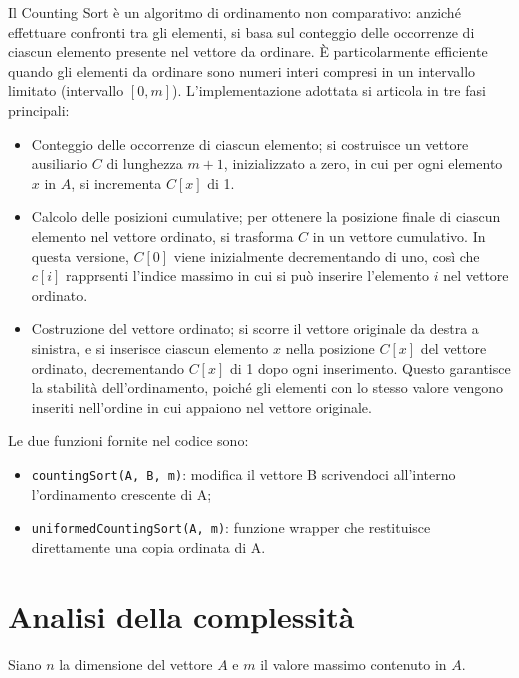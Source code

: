 \documentclass[a4paper, 12pt, oneside]{book}
\begin{document}
Il Counting Sort è un algoritmo di ordinamento non comparativo: anziché effettuare confronti tra gli elementi, si basa sul conteggio delle occorrenze di ciascun elemento presente nel vettore da ordinare.
È particolarmente efficiente quando gli elementi da ordinare sono numeri interi compresi in un intervallo limitato (intervallo \([0, m]\)).
L'implementazione adottata si articola in tre fasi principali:

\begin{itemize}
    \item Conteggio delle occorrenze di ciascun elemento; si costruisce un vettore ausiliario \(C\) di lunghezza \(m+1\), inizializzato a zero, in cui per ogni elemento \(x\) in \(A\), si incrementa \(C[x]\) di 1.
    \item Calcolo delle posizioni cumulative; per ottenere la posizione finale di ciascun elemento nel vettore ordinato, si trasforma \(C\) in un vettore cumulativo. In questa versione, \(C[0]\) viene inizialmente decrementando di uno, così che \(c[i]\) rapprsenti l'indice massimo in cui si può inserire l'elemento \(i\) nel vettore ordinato.
    \item Costruzione del vettore ordinato; si scorre il vettore originale da destra a sinistra, e si inserisce ciascun elemento \(x\) nella posizione \(C[x]\) del vettore ordinato, decrementando \(C[x]\) di 1 dopo ogni inserimento. Questo garantisce la stabilità dell'ordinamento, poiché gli elementi con lo stesso valore vengono inseriti nell'ordine in cui appaiono nel vettore originale.
\end{itemize}

\noindent Le due funzioni fornite nel codice sono:

\begin{itemize}
    \item \texttt{countingSort(A, B, m)}: modifica il vettore B scrivendoci all'interno l'ordinamento crescente di A;
    \item \texttt{uniformedCountingSort(A, m)}: funzione wrapper che restituisce direttamente una copia ordinata di A.
\end{itemize}

\section{Analisi della complessità}

Siano \(n\) la dimensione del vettore \(A\) e \(m\) il valore massimo contenuto in \(A\). \\
\end{document}
